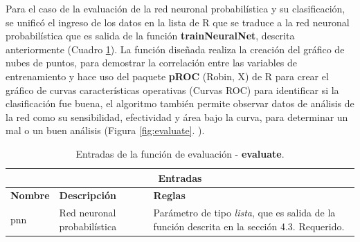 	Para el caso de la evaluación de la red neuronal probabilística y su clasificación, se unificó el ingreso de los datos en la lista de R que se traduce a la red neuronal probabilística que es salida de la función \textbf{trainNeuralNet}, descrita anteriormente (Cuadro \ref{tabla:entradasEvaluate}). La función diseñada realiza la creación del gráfico de nubes de puntos, para demostrar la correlación entre las variables de entrenamiento y hace uso del paquete \textbf{pROC} (Robin, X) de R para crear el gráfico de curvas características operativas (Curvas ROC) para identificar si la clasificación fue buena, el algoritmo también permite observar datos de análisis de la red como su sensibilidad, efectividad y área bajo la curva, para determinar un mal o un buen análisis (Figura \ref{fig:evaluate}. ).\\

\begin{table}[htb]
\begin{center}
\begin{tabular}{|p{3cm}|p{5cm}|p{8cm}|}
\hline
\multicolumn{3}{|c|}{\textbf{Entradas}} \\
\hline
\textbf{Nombre} & \textbf{Descripción} & \textbf{Reglas} \\
\hline \hline
pnn & Red neuronal probabilística & Parámetro de tipo \textit{lista}, que es salida de la función descrita en la sección 4.3. Requerido. \\ \hline
\end{tabular}
\caption{Entradas de la función de evaluación - \textbf{evaluate}.}
\label{tabla:entradasEvaluate}
\end{center}
\end{table}

